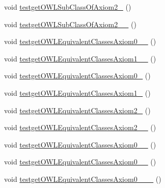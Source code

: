 \begin{DoxyCompactItemize}
\item 
void \hyperlink{classorg_1_1semanticweb_1_1owlapi_1_1api_1_1test_1_1_null_check_test_case_af3eb638f45953ba37613b9ba792a1f67}{testget\-O\-W\-L\-Sub\-Class\-Of\-Axiom2\-\_} ()
\item 
void \hyperlink{classorg_1_1semanticweb_1_1owlapi_1_1api_1_1test_1_1_null_check_test_case_aec1442f97c33dea9851efa51969295a1}{testget\-O\-W\-L\-Sub\-Class\-Of\-Axiom2\-\_\-\_} ()
\item 
void \hyperlink{classorg_1_1semanticweb_1_1owlapi_1_1api_1_1test_1_1_null_check_test_case_a13d8a74ee4d8adbf41648daebca1d9b4}{testget\-O\-W\-L\-Equivalent\-Classes\-Axiom0\-\_\-\_} ()
\item 
void \hyperlink{classorg_1_1semanticweb_1_1owlapi_1_1api_1_1test_1_1_null_check_test_case_a6ee09e87733dac9cc2b413fb4895f734}{testget\-O\-W\-L\-Equivalent\-Classes\-Axiom1\-\_\-\_} ()
\item 
void \hyperlink{classorg_1_1semanticweb_1_1owlapi_1_1api_1_1test_1_1_null_check_test_case_a3c9efcd0388087617bad3baa3ae23f8e}{testget\-O\-W\-L\-Equivalent\-Classes\-Axiom0\-\_} ()
\item 
void \hyperlink{classorg_1_1semanticweb_1_1owlapi_1_1api_1_1test_1_1_null_check_test_case_a1609d6aba1d228293c471eda7abd1969}{testget\-O\-W\-L\-Equivalent\-Classes\-Axiom1\-\_} ()
\item 
void \hyperlink{classorg_1_1semanticweb_1_1owlapi_1_1api_1_1test_1_1_null_check_test_case_a51abaab9910f974ccd9a59f90633844d}{testget\-O\-W\-L\-Equivalent\-Classes\-Axiom2\-\_} ()
\item 
void \hyperlink{classorg_1_1semanticweb_1_1owlapi_1_1api_1_1test_1_1_null_check_test_case_aceb3283e5544cf748cdfb3b9db4efe61}{testget\-O\-W\-L\-Equivalent\-Classes\-Axiom2\-\_\-\_} ()
\item 
void \hyperlink{classorg_1_1semanticweb_1_1owlapi_1_1api_1_1test_1_1_null_check_test_case_a59e2305670cdb38f4620e362eb75bfe1}{testget\-O\-W\-L\-Equivalent\-Classes\-Axiom0\-\_\-\_} ()
\item 
void \hyperlink{classorg_1_1semanticweb_1_1owlapi_1_1api_1_1test_1_1_null_check_test_case_a8fa15846c64a541ed90c33af64f487b4}{testget\-O\-W\-L\-Equivalent\-Classes\-Axiom0\-\_\-\_} ()
\item 
void \hyperlink{classorg_1_1semanticweb_1_1owlapi_1_1api_1_1test_1_1_null_check_test_case_abd91612b9c2b4481e56c3df7389fee2e}{testget\-O\-W\-L\-Equivalent\-Classes\-Axiom0\-\_\-\_\-\_} ()
\item 

\end{DoxyCompactItemize}
